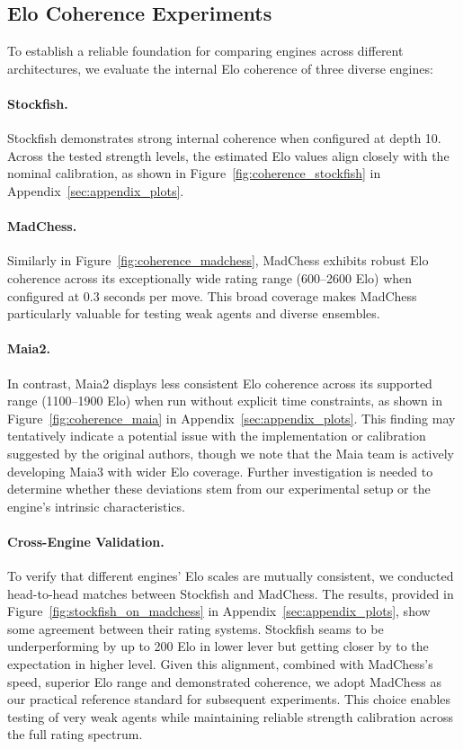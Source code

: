 \documentclass{article}
\begin{document}
\subsection{Elo Coherence Experiments}\label{sec:experiment}

To establish a reliable foundation for comparing engines across different architectures, we evaluate the internal Elo coherence of three diverse engines:

\paragraph{Stockfish.} Stockfish demonstrates strong internal coherence when configured at depth 10.
Across the tested strength levels, the estimated Elo values align closely with the nominal calibration, as shown in Figure~\ref{fig:coherence_stockfish} in Appendix~\ref{sec:appendix_plots}.

\paragraph{MadChess.} Similarly in Figure~\ref{fig:coherence_madchess}, MadChess exhibits robust Elo coherence across its exceptionally wide rating range (600--2600 Elo) when configured at 0.3 seconds per move.
This broad coverage makes MadChess particularly valuable for testing weak agents and diverse ensembles.

\paragraph{Maia2.} In contrast, Maia2 displays less consistent Elo coherence across its supported range (1100--1900 Elo) when run without explicit time constraints, as shown in Figure~\ref{fig:coherence_maia} in Appendix~\ref{sec:appendix_plots}.
This finding may tentatively indicate a potential issue with the implementation or calibration suggested by the original authors, though we note that the Maia team is actively developing Maia3 with wider Elo coverage.
Further investigation is needed to determine whether these deviations stem from our experimental setup or the engine's intrinsic characteristics.

\paragraph{Cross-Engine Validation.} To verify that different engines' Elo scales are mutually consistent, we conducted head-to-head matches between Stockfish and MadChess.
The results, provided in Figure~\ref{fig:stockfish_on_madchess} in Appendix~\ref{sec:appendix_plots}, show some agreement between their rating systems.
Stockfish seams to be underperforming by up to 200 Elo in lower lever but getting closer by to the expectation in higher level.
Given this alignment, combined with MadChess's speed, superior Elo range and demonstrated coherence, we adopt MadChess as our practical reference standard for subsequent experiments.
This choice enables testing of very weak agents while maintaining reliable strength calibration across the full rating spectrum.
\end{document}
